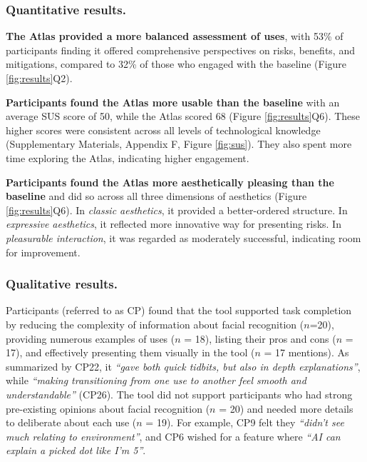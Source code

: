 \subsubsection{Quantitative results.}
\textbf{The Atlas provided a more balanced assessment of uses}, with 53\% of participants finding it offered comprehensive perspectives on risks, benefits, and mitigations, compared to 32\% of those who engaged with the baseline (Figure \ref{fig:results}Q2).

\vspace{2pt}
\noindent\textbf{Participants found the Atlas more usable than the baseline} with an average SUS score of 50, while the Atlas scored 68 (Figure \ref{fig:results}Q6). These higher scores were consistent across all levels of technological knowledge (Supplementary Materials, Appendix F, Figure \ref{fig:sus}). They also spent more time exploring the Atlas, indicating higher engagement.

\vspace{2pt}
\noindent\textbf{Participants found the Atlas more aesthetically pleasing than the baseline} and did so across all three dimensions of aesthetics (Figure \ref{fig:results}Q6). In \emph{classic aesthetics}, it provided a better-ordered structure. In \emph{expressive aesthetics}, it reflected more innovative way for presenting risks. In \emph{pleasurable interaction}, it was regarded as moderately successful, indicating room for improvement.

\subsubsection{Qualitative results.}
Participants (referred to as CP) found that the tool supported task completion by reducing the complexity of information about facial recognition ($n$=20), providing numerous examples of uses ($n$ = 18), listing their pros and cons ($n$ = 17), and effectively presenting them visually in the tool ($n$ = 17 mentions). As summarized by CP22, it \emph{``gave both quick tidbits, but also in depth explanations''}, while \emph{``making transitioning from one use to another feel smooth and understandable''} (CP26). The tool did not support participants who had strong pre-existing opinions about facial recognition ($n$ = 20) and needed more details to deliberate about each use ($n$ = 19). For example, CP9 felt they \emph{``didn't see much relating to environment''}, and CP6 wished for a feature where \emph{``AI can explain a picked dot like I'm 5''}.